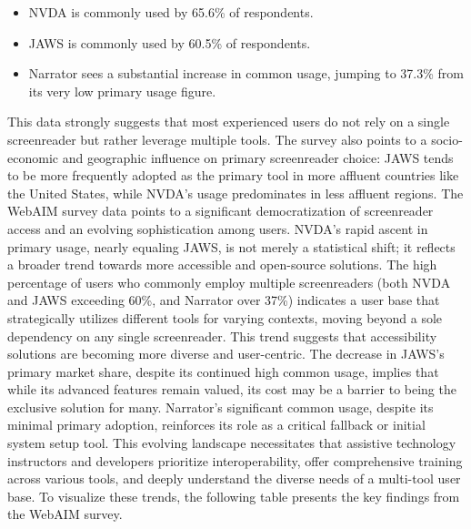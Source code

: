 \begin{itemize}
	\item NVDA is commonly used by 65.6\% of respondents.\supercite{kingsbury2025}
	\item JAWS is commonly used by 60.5\% of respondents.\supercite{kingsbury2025}
	\item Narrator sees a substantial increase in common usage, jumping to 37.3\% from its very low primary usage figure.\supercite{kingsbury2025}
\end{itemize}
This data strongly suggests that most experienced users do not rely on a single screenreader but rather leverage multiple tools. The survey also points to a socio-economic and geographic influence on primary screenreader choice: JAWS tends to be more frequently adopted as the primary tool in more affluent countries like the United States, while NVDA's usage predominates in less affluent regions.\supercite{kingsbury2025}
The WebAIM survey data points to a significant democratization of screenreader access and an evolving sophistication among users. NVDA's rapid ascent in primary usage, nearly equaling JAWS, is not merely a statistical shift; it reflects a broader trend towards more accessible and open-source solutions. The high percentage of users who commonly employ multiple screenreaders (both NVDA and JAWS exceeding 60\%, and Narrator over 37\%) indicates a user base that strategically utilizes different tools for varying contexts, moving beyond a sole dependency on any single screenreader. This trend suggests that accessibility solutions are becoming more diverse and user-centric. The decrease in JAWS's primary market share, despite its continued high common usage, implies that while its advanced features remain valued, its cost may be a barrier to being the exclusive solution for many. Narrator's significant common usage, despite its minimal primary adoption, reinforces its role as a critical fallback or initial system setup tool. This evolving landscape necessitates that assistive technology instructors and developers prioritize interoperability, offer comprehensive training across various tools, and deeply understand the diverse needs of a multi-tool user base.
To visualize these trends, the following table presents the key findings from the WebAIM survey.

